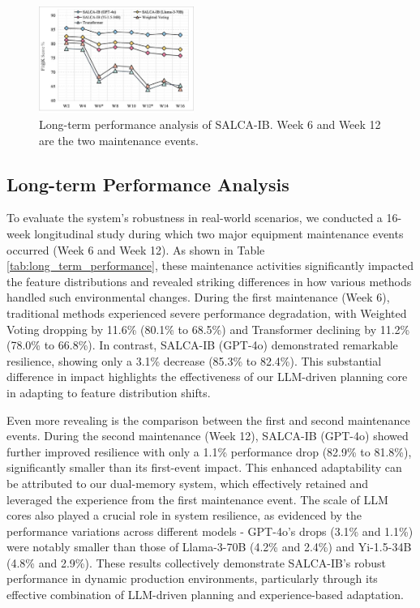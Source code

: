 \documentclass[conference]{IEEEtran}
\begin{document}
\begin{figure}[t]
    \centering
    \includegraphics[width=0.45\textwidth]{fig/longtime.jpg}
    \caption{Long-term performance analysis of SALCA-IB. Week 6 and Week 12 are the two maintenance events.}
    \label{fig:salca-ib}
\end{figure}

\subsection{Long-term Performance Analysis}

To evaluate the system's robustness in real-world scenarios, we conducted a 16-week longitudinal study during which two major equipment maintenance events occurred (Week 6 and Week 12). As shown in Table \ref{tab:long_term_performance}, these maintenance activities significantly impacted the feature distributions and revealed striking differences in how various methods handled such environmental changes. During the first maintenance (Week 6), traditional methods experienced severe performance degradation, with Weighted Voting dropping by 11.6\% (80.1\% to 68.5\%) and Transformer declining by 11.2\% (78.0\% to 66.8\%). In contrast, SALCA-IB (GPT-4o) demonstrated remarkable resilience, showing only a 3.1\% decrease (85.3\% to 82.4\%). This substantial difference in impact highlights the effectiveness of our LLM-driven planning core in adapting to feature distribution shifts.

Even more revealing is the comparison between the first and second maintenance events. During the second maintenance (Week 12), SALCA-IB (GPT-4o) showed further improved resilience with only a 1.1\% performance drop (82.9\% to 81.8\%), significantly smaller than its first-event impact. This enhanced adaptability can be attributed to our dual-memory system, which effectively retained and leveraged the experience from the first maintenance event. The scale of LLM cores also played a crucial role in system resilience, as evidenced by the performance variations across different models - GPT-4o's drops (3.1\% and 1.1\%) were notably smaller than those of Llama-3-70B (4.2\% and 2.4\%) and Yi-1.5-34B (4.8\% and 2.9\%). These results collectively demonstrate SALCA-IB's robust performance in dynamic production environments, particularly through its effective combination of LLM-driven planning and experience-based adaptation.
\end{document}
